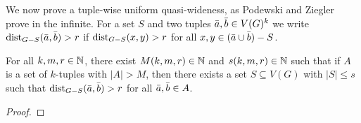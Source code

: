 We now prove a tuple-wise uniform quasi-wideness, as Podewski and Ziegler 
prove in the infinite. For a set $S$ and two tuples $\bar{a},\bar{b}\in V(G)^k$
we write $\mathrm{dist}_{G-S}(\bar{a},\bar{b})>r$ if $\mathrm{dist}_{G-S}(x,y)>r$ for all $x,y\in 
(\bar{a}\cup\bar{b})- S$. 

\begin{lemma}
For all $k,m,r\in \mathbb{N}$, there exist $M(k,m,r)\in \mathbb{N}$ and 
$s(k,m,r)\in \mathbb{N}$ such that if $A$ is a set of $k$-tuples
with $|A|>M$, then there exists a set $S\subseteq V(G)$
with $|S|\leq s$ such that $\mathrm{dist}_{G-S}(\bar{a},\bar{b})>r$
for all $\bar{a},\bar{b}\in A$. 
\end{lemma}
\begin{proof}

\end{proof}
